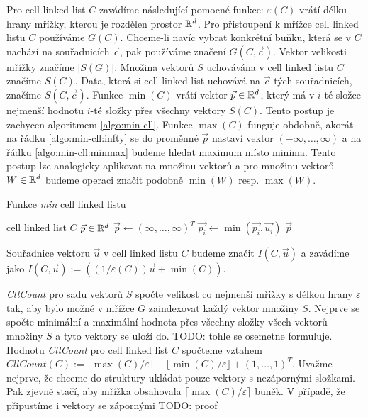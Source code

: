 Pro cell linked list $C$ zavádíme následující pomocné funkce: $\varepsilon(C)$ vrátí délku hrany mřížky, kterou je rozdělen prostor $\mathbb{R}^d$. Pro přistoupení k mřížce cell linked listu $C$ používáme $G(C)$. Chceme-li navíc vybrat konkrétní buňku, která se v $C$ nachází na souřadnicích $\vec{c}$, pak používáme značení $G(C, \vec{c})$. Vektor velikosti mřížky značíme $|S(G)|$. Množina vektorů $S$ uchovávána v cell linked listu $C$ značíme $S(C)$. Data, která si cell linked list uchovává na $\vec{c}$-tých souřadnicích, značíme $S(C, \vec{c})$.
Funkce $\min(C)$ vrátí vektor $\vec{p} \in \mathbb{R}^d$, který má v $i$-té složce nejmenší hodnotu $i$-té složky přes všechny vektory $S(C)$. Tento postup je zachycen algoritmem \ref{algo:min-cll}. Funkce $\max(C)$ funguje obdobně, akorát na řádku \ref{algo:min-cll:infty} se do proměnné $\vec{p}$ nastaví vektor $(-\infty, \ldots, \infty)$ a na řádku \ref{algo:min-cll:minmax} budeme hledat maximum místo minima. Tento postup lze analogicky aplikovat na množinu vektorů a pro množinu vektorů $W \in \mathbb{R}^d$ budeme operaci značit podobně $\min(W)$ resp. $\max(W)$.

\begin{algorithm}[!h]
  \caption{Funkce \textit{min} cell linked listu}
  \label{algo:min-cll}
  \begin{algorithmic}[1]
    \REQUIRE cell linked list $C$
    \ENSURE $\vec{p} \in \mathbb{R}^d$
    \STATE $\vec{p} \leftarrow (\infty, \ldots, \infty)^T$ \label{algo:min-cll:infty}
          \STATE $\vec{p_i} \leftarrow \min(\vec{p_i}, \vec{u_i})$ \label{algo:min-cll:minmax}
        \ENDFOR
    \ENDFOR
    \RETURN $\vec{p}$
  \end{algorithmic}
\end{algorithm}

Souřadnice vektoru $\vec{u}$ v cell linked listu $C$ budeme značit $I(C, \vec{u})$ a zavádíme jako $I(C, \vec{u}) := ((1 / \varepsilon(C)) \vec{u} + \min(C))$.

\textit{CllCount} pro sadu vektorů $S$ spočte velikost co nejmenší mřižky s délkou hrany $\varepsilon$ tak, aby bylo možné v mřížce $G$ zaindexovat každý vektor množiny $S$. Nejprve se spočte minimální a maximální hodnota přes všechny složky všech vektorů množiny $S$ a tyto vektory se uloží do. TODO: tohle se osemetne formuluje. Hodnotu \textit{CllCount} pro cell linked list $C$ spočteme vztahem $\mathit{CllCount}(C) := \lceil\max(C)/\varepsilon\rceil - \lfloor\min(C)/\varepsilon\rfloor + (1, \ldots, 1)^T$. Uvažme nejprve, že chceme do struktury ukládat pouze vektory s nezápornými složkami. Pak zjevně stačí, aby mřížka obsahovala $\lceil\max(C)/\varepsilon\rceil$ buněk. V případě, že připustíme i vektory se zápornými TODO: proof

